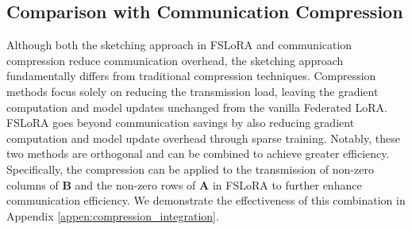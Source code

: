 \documentclass{article} %
\theoremstyle{plain}
\theoremstyle{definition}
\begin{document}
\subsection{Comparison with Communication Compression}

Although both the sketching approach in FSLoRA and communication compression \citep{kuo2024federatedlorasparsecommunication} reduce communication overhead, the sketching approach fundamentally differs from traditional compression techniques. Compression methods focus solely on reducing the transmission load, leaving the gradient computation and model updates unchanged from the vanilla Federated LoRA. FSLoRA goes beyond communication savings by also reducing gradient computation and model update overhead through sparse training.  Notably, these two methods are orthogonal and can be combined to achieve greater efficiency. Specifically, the compression can be applied to the transmission of non-zero columns of \( \mathbf{B} \) and the non-zero rows of \( \mathbf{A} \) in FSLoRA to further enhance communication efficiency. We demonstrate the effectiveness of this combination in Appendix \ref{appen:compression_integration}.


\end{document}
